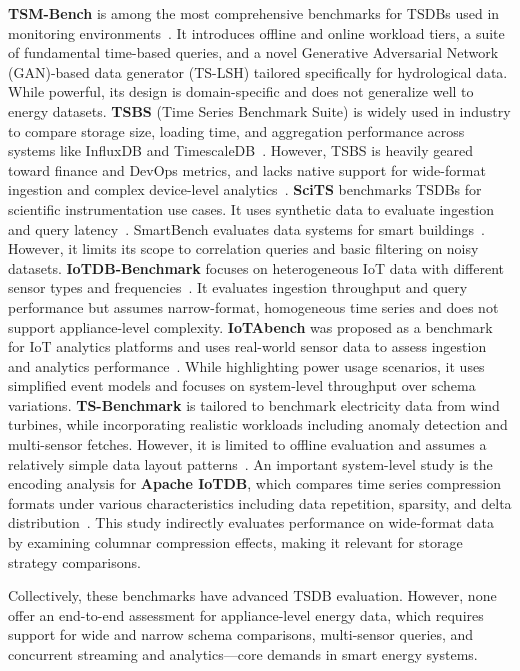 \documentclass[conference]{IEEEtran}
\begin{document}
\textbf{TSM-Bench} is among the most comprehensive benchmarks for TSDBs used in monitoring environments~\cite{1_tsmbench2023}. It introduces offline and online workload tiers, a suite of fundamental time-based queries, and a novel Generative Adversarial Network (GAN)-based data generator (TS-LSH) tailored specifically for hydrological data. While powerful, its design is domain-specific and does not generalize well to energy datasets. \textbf{TSBS} (Time Series Benchmark Suite) is widely used in industry to compare storage size, loading time, and aggregation performance across systems like InfluxDB and TimescaleDB~\cite{3_tsbs}. However, TSBS is heavily geared toward finance and DevOps metrics, and lacks native support for wide-format ingestion and complex device-level analytics~\cite{3_tsbs}.
\textbf{SciTS} benchmarks TSDBs for scientific instrumentation use cases. It uses synthetic data to evaluate ingestion and query latency~\cite{5_scits2022}. SmartBench evaluates data systems for smart buildings~\cite{4_smartbench2020}. However, it limits its scope to correlation queries and basic filtering on noisy datasets. 
\textbf{IoTDB-Benchmark} focuses on heterogeneous IoT data with different sensor types and frequencies~\cite{7_iotdbbenchmark}. It evaluates ingestion throughput and query performance but assumes narrow-format, homogeneous time series and does not support appliance-level complexity.
\textbf{IoTAbench} was proposed as a benchmark for IoT analytics platforms and uses real-world sensor data to assess ingestion and analytics performance~\cite{9_iotabench2015}. While highlighting power usage scenarios, it uses simplified event models and focuses on system-level throughput over schema variations.
\textbf{TS-Benchmark} is tailored to benchmark electricity data from wind turbines, while incorporating realistic workloads including anomaly detection and multi-sensor fetches. However, it is limited to offline evaluation and assumes a relatively simple data layout patterns~\cite{10_tsbenchmark2021}.
An important system-level study is the encoding analysis for \textbf{Apache IoTDB}, which compares time series compression formats under various characteristics including data repetition, sparsity, and delta distribution~\cite{11_iotdbencoding2022}. This study indirectly evaluates performance on wide-format data by examining columnar compression effects, making it relevant for storage strategy comparisons.

Collectively, these benchmarks have advanced TSDB evaluation. However, none offer an end-to-end assessment for appliance-level energy data, which requires support for wide and narrow schema comparisons, multi-sensor queries, and concurrent streaming and analytics—core demands in smart energy systems.
\end{document}
